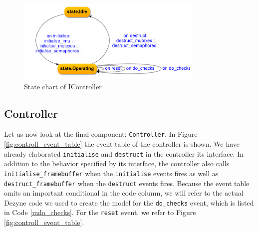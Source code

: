 \documentclass[12pt]{scrreprt}
\begin{document}
\begin{figure}[H]
    \centering
    \includegraphics[width=0.8\textwidth]{Figures/results/modelling_figures/IController/IController_state_chart.png}
    \caption{State chart of IController}
    \label{fig:IController_state_chart}
\end{figure}

\subsection{Controller}
Let us now look at the final component: \texttt{Controller}. In Figure \ref{fig:controll_event_table} the event table of the controller is shown. We have already elaborated \texttt{initialise} and \texttt{destruct} in the controller its interface. In addition to the behavior specified by its interface, the controller also calls \texttt{initialise\_framebuffer} when the \texttt{initialise} events fires as well as \texttt{destruct\_framebuffer} when the \texttt{destruct} events fires. Because the event table omits an important conditional in the code column, we will refer to the actual Dezyne code we used to create the model for the \texttt{do\_checks} event, which is listed in Code \ref{mdo_checks}. For the \texttt{reset} event, we refer to Figure \ref{fig:controll_event_table}.
\par
\end{document}

